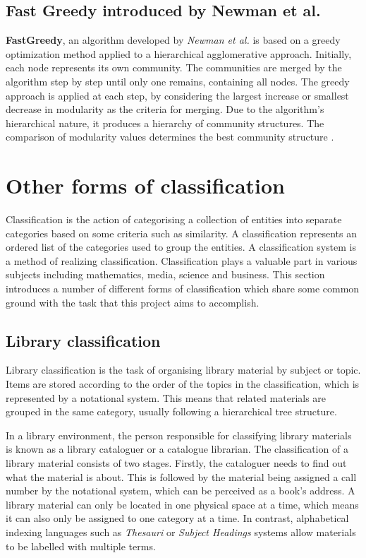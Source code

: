 \subsection{Fast Greedy introduced by Newman et al.}

\textbf{FastGreedy}, an algorithm developed by \textit{Newman et al.} \cite{newman2004fast} is based on a greedy optimization method applied to a hierarchical agglomerative approach. Initially, each node represents its own community. The communities are merged by the algorithm step by step until only one remains, containing all nodes. The greedy approach is applied at each step, by considering the largest increase or smallest decrease in modularity as the criteria for merging. Due to the algorithm's hierarchical nature, it produces a hierarchy of community structures. The comparison of modularity values determines the best community structure \cite{orman2011accuracy}.

\section{Other forms of classification}

Classification is the action of categorising a collection of entities into separate categories based on some criteria such as similarity. A classification represents an ordered list of the categories used to group the entities. A classification system is a method of realizing classification. Classification plays a valuable part in various subjects including mathematics, media, science and business. This section introduces a number of different forms of classification which share some common ground with the task that this project aims to accomplish.

\subsection{Library classification}

Library classification is the task of organising library material by subject or topic. Items are stored according to the order of the topics in the classification, which is represented by a notational system. This means that related materials are grouped in the same category, usually following a hierarchical tree structure.

In a library environment, the person responsible for classifying library materials is known as a library cataloguer or a catalogue librarian. The classification of a library material consists of two stages. Firstly, the cataloguer needs to find out what the material is about. This is followed by the material being assigned a call number by the notational system, which can be perceived as a book's address. A library material can only be located in one physical space at a time, which means it can also only be assigned to one category at a time. In contrast, alphabetical indexing languages such as \textit{Thesauri} or \textit{Subject Headings} systems allow materials to be labelled with multiple terms.

